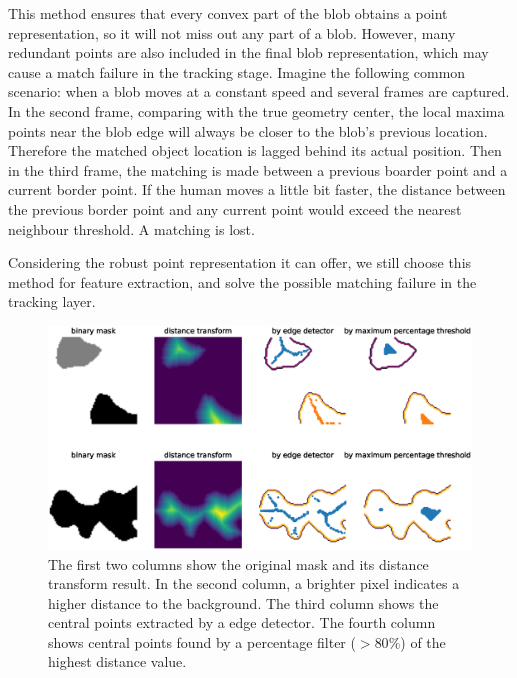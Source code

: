 This method ensures that every convex part of the blob obtains a point representation, so it will not miss out any part of a blob. However, many redundant points are also included in the final blob representation, which may cause a match failure in the tracking stage. Imagine the following common scenario: when a blob moves at a constant speed and several frames are captured. In the second frame, comparing with the true geometry center, the local maxima points near the blob edge will always be closer to the blob's previous location. Therefore the matched object location is lagged behind its actual position. Then in the third frame, the matching is made between a previous boarder point and a current border point. If the human moves a little bit faster, the distance between the previous border point and any current point would exceed the nearest neighbour threshold. A matching is lost.

Considering the robust point representation it can offer, we still choose this method for feature extraction, and solve the possible matching failure in the tracking layer.
\begin{figure}
  \centering
  \includegraphics[width=\textwidth]{figures/centralsbyfilter.eps}
  \caption{The first two columns show the original mask and its distance transform result. In the second column, a brighter pixel indicates a higher distance to the background. The third column shows the central points extracted by a edge detector. The fourth column shows central points found by a percentage filter ($> 80\%$) of the highest distance value.}
  \label{fig:DTafterfilter}
\end{figure}

